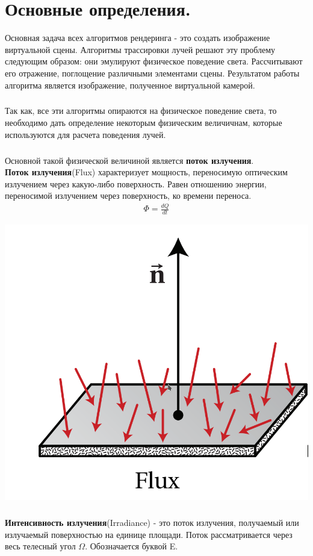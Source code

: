 \documentclass[titlepage]{article}
\begin{document}
\section{Основные определения.}
Основная задача всех алгоритмов рендеринга - это создать изображение виртуальной сцены. Алгоритмы трассировки лучей решают эту проблему следующим образом: они эмулируют физическое поведение света. Рассчитывают его отражение, поглощение различными элементами сцены. Результатом работы алгоритма является изображение, полученное виртуальной камерой.
\subparagraph{} Так как, все эти алгоритмы опираются на физическое поведение света, то необходимо дать определение некоторым физическим величичнам, которые используются для расчета поведения лучей.
\subparagraph{} Основной такой физической величиной является \textbf{поток излучения}.\\
\textbf{Поток излучения}(Flux) характеризует мощность, переносимую оптическим излучением через какую-либо поверхность. Равен отношению энергии, переносимой излучением через поверхность, ко времени переноса.
\begin{gather} 
	\Phi = \frac{dQ}{dt}
\end{gather}
\begin{center}
	\includegraphics[scale=0.5]{Flux.png}
\end{center}
\subparagraph{} \textbf{Интенсивность излучения}(Irradiance) - это поток излучения, получаемый или излучаемый поверхностью на единице площади. Поток рассматривается через весь телесный угол $\Omega$. Обозначается буквой E.
\end{document}
